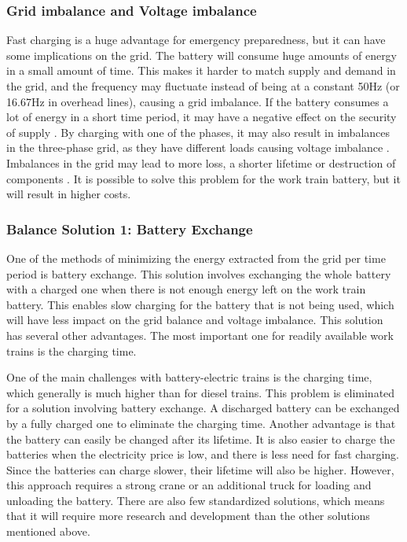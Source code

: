 \documentclass{article}
\begin{document}
\subsubsection*{Grid imbalance and Voltage imbalance}

Fast charging is a huge advantage for emergency preparedness, but it can have some implications on the grid. The battery will consume huge amounts of energy in a small amount of time. This makes it harder to match supply and demand in the grid, and the frequency may fluctuate instead of being at a constant 50Hz (or 16.67Hz in overhead lines), causing a grid imbalance. If the battery consumes a lot of energy in a short time period, it may have a negative effect on the security of supply \cite{rme}.
By charging with one of the phases, it may also result in imbalances in the three-phase grid, as they have different loads causing voltage imbalance \cite{distro}.
Imbalances in the grid may lead to more loss, a shorter lifetime or destruction of components \cite{rme}.
It is possible to solve this problem for the work train battery, but it will result in higher costs.

\subsubsection*{Balance Solution 1: Battery Exchange}

One of the methods of minimizing the energy extracted from the grid per time period is battery exchange. This solution involves exchanging the whole battery with a charged one when there is not enough energy left on the work train battery. This enables slow charging for the battery that is not being used, which will have less impact on the grid balance and voltage imbalance. This solution has several other advantages. The most important one for readily available work trains is the charging time.

One of the main challenges with battery-electric trains is the charging time, which generally is much higher than for diesel trains. This problem is eliminated for a solution involving battery exchange. A discharged battery can be exchanged by a fully charged one to eliminate the charging time. Another advantage is that the battery can easily be changed after its lifetime. It is also easier to charge the batteries when the electricity price is low, and there is less need for fast charging. Since the batteries can charge slower, their lifetime will also be higher. However, this approach requires a strong crane or an additional truck for loading and unloading the battery. There are also few standardized solutions, which means that it will require more research and development than the other solutions mentioned above.
\end{document}
